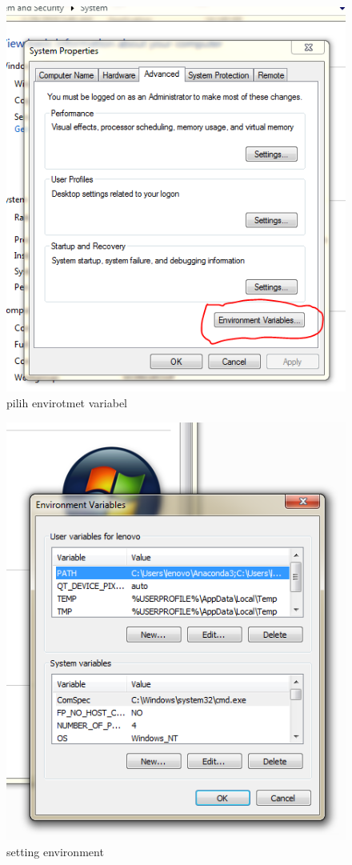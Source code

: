 	\begin{figure}
	\includegraphics[scale=0.5]{section/envirotment2}
	\centering
	\caption{pilih envirotmet variabel}
	\end{figure}
	
	\begin{figure}
	\includegraphics[scale=0.5]{section/envirotment3}
	\centering
	\caption{setting environment}
	\end{figure}
